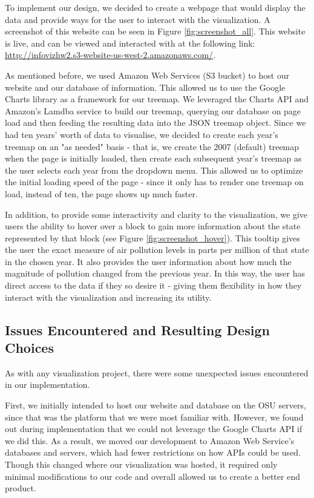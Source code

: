 \documentclass[journal]{vgtc}                %
\begin{document}
To implement our design, we decided to create a webpage that would display the data and provide ways for the user to
interact with the visualization. A screenshot of this website can be seen in Figure \ref{fig:screenshot_all}.
This website is live, and can be viewed and interacted with at the following link:
\url{http://infovizhw2.s3-website-us-west-2.amazonaws.com/}.

As mentioned before, we used Amazon Web Services (S3 bucket) to host our website and our database of information. This allowed us to
use the Google Charts library as a framework for our treemap. We leveraged the Charts API and Amazon's Lamdba service to build our treemap, querying our
database on page load and then feeding the resulting data into the JSON treemap object. Since we had ten years' worth of data to
visualise, we decided to create each year's treemap on an "as needed" basis - that is, we create the 2007 (default) treemap when the
page is initially loaded, then create each subsequent year's treemap as the user selects each year from the dropdown menu.
This allowed us to optimize the initial loading speed of the page - since it only has to render one treemap on load, instead of
ten, the page shows up much faster.

In addition, to provide some interactivity and clarity to the visualization, we give users the ability to hover over a block to 
gain more information about the state represented by that block (see Figure \ref{fig:screenshot_hover}). This tooltip gives the user the
exact measure of air pollution levels in parts per million of that state in the chosen year. It also provides the user information about
how much the magnitude of pollution changed from the previous year. In this way, the user has direct access to the data if they so desire it - 
giving them flexibility in how they interact with the visualization and increasing its utility.

\subsection{Issues Encountered and Resulting Design Choices}

As with any visualization project, there were some unexpected issues encountered in our implementation. 

First, we initially intended to host our website and database on the OSU servers, since that was the platform that we were
most familiar with. However, we found out during implementation that we could not leverage the Google Charts API if we did
this. As a result, we moved our development to Amazon Web Service's databases and servers, which had fewer restrictions on 
how APIs could be used. Though this changed where our visualization was hosted, it required only minimal modifications to 
our code and overall allowed us to create a better end product.
\end{document}
